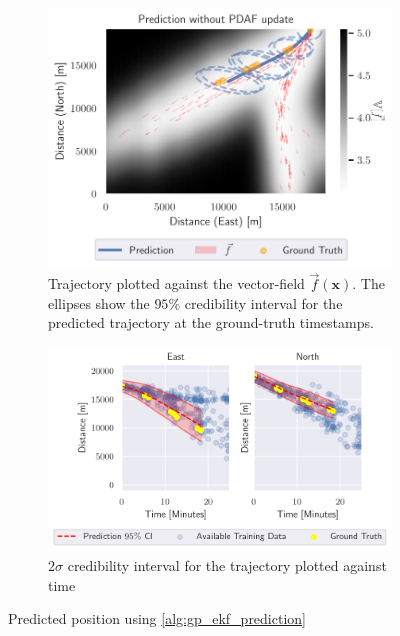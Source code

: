 \begin{figure}
    \centering
    \begin{subfigure}{\textwidth}
        \centering
        \includegraphics[width=\textwidth]{figures/dyngp/gp_ekf.pdf}
        \caption{Trajectory plotted against the vector-field $\vec{f}(\boldsymbol{x})$. The ellipses show the $95\%$ credibility interval for the predicted trajectory at the ground-truth timestamps.}
    \end{subfigure}
    \begin{subfigure}{\textwidth}
        \centering
        \includegraphics[width=\textwidth]{figures/dyngp/gp_ekf_state.pdf}
        \caption{$2\sigma$ credibility interval for the trajectory plotted against time}
    \end{subfigure}
    \caption{Predicted position using \cref{alg:gp_ekf_prediction}}
    \label{fig:gp_ekf}
\end{figure}


